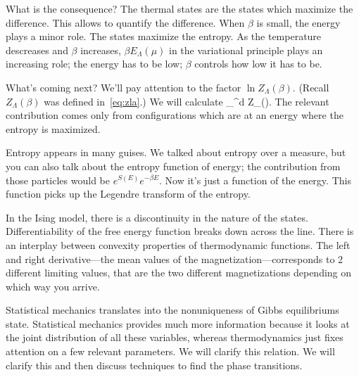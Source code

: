 \documentclass[12pt]{book}
\theoremstyle{norm}
\begin{document}
What is the consequence? The thermal states are the states which maximize the difference. This allows to quantify the difference. When $\beta$ is small, the energy plays a minor role. The states maximize the entropy. As the temperature descreases and $\beta$ increases, $\beta E_\Lambda(\mu)$ in the variational principle plays an increasing role; the energy has to be low; $\beta$ controls how low it has to be. 

What's coming next? We'll pay attention to the factor $\ln Z_\Lambda(\beta)$. (Recall $Z_\Lambda(\beta)$ was defined in~\eqref{eq:zla}.) We will calculate 
\be\lim_{\Lambda \nearrow{}^d}  \ln Z_{\Lambda}(\beta).\ee
The relevant contribution comes only from configurations which are at an energy where the entropy is maximized. 

Entropy appears in many guises. We talked about entropy over a measure, but you can also talk about the entropy function of energy; the contribution from those particles would be $e^{S(E)}e^{-\beta E}$. Now it's just a function of the energy. This function picks up the Legendre transform of the entropy.


In the Ising model, there is a discontinuity in the nature of the states. Differentiability of the free energy function breaks down across the line. There is an interplay between convexity properties of thermodynamic functions. The left and right derivative---the mean values of the magnetization---corresponds to 2 different limiting values, that are the two different magnetizations depending on which way you arrive. %

Statistical mechanics translates into the nonuniqueness of Gibbs equilibriums state. Statistical mechanics provides much more information because it looks at the joint distribution of all these variables, whereas thermodynamics just fixes attention on a few relevant parameters. We will clarify this relation. 
We will clarify this and then discuss techniques to find the phase transitions.

\end{document}
